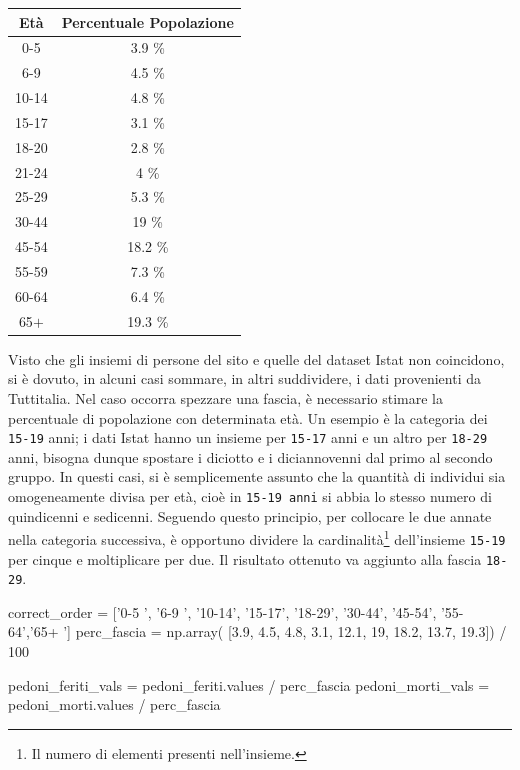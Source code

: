 \documentclass[a4paper,12pt]{report}
\newcommand{\columnstyle}[1]{\texttt{#1}}
\begin{document}
\begin{center}
    \def\arraystretch{1.5}%
    \begin{tabular}{ |c|c| } 
    \hline
    Età & Percentuale Popolazione \\ 
    \hline
    \rowcolor{TableGray}
    0-5     & 3.9 \% \\ 
    6-9     & 4.5 \% \\
    \rowcolor{TableGray}
    10-14   & 4.8 \% \\
    15-17   & 3.1 \% \\
    \rowcolor{TableGray}
    18-20   & 2.8 \% \\ 
    21-24   & 4   \% \\
    \rowcolor{TableGray}
    25-29   & 5.3 \% \\
    30-44   & 19  \% \\
    \rowcolor{TableGray}
    45-54   & 18.2 \% \\ 
    55-59   & 7.3 \% \\
    \rowcolor{TableGray}
    60-64   & 6.4 \% \\
    65$+$   & 19.3 \% \\
    \hline
    \end{tabular}
\end{center}

Visto che gli insiemi di persone del sito e quelle del dataset Istat non coincidono, 
si è dovuto, in alcuni casi sommare, in altri suddividere, 
i dati provenienti da Tuttitalia. 
Nel caso occorra spezzare una fascia, è necessario stimare la percentuale 
di popolazione con determinata età. 
Un esempio è la categoria dei \columnstyle{15-19} anni; 
i dati Istat hanno un insieme per \columnstyle{15-17} anni e un altro per 
\columnstyle{18-29} anni, 
bisogna dunque spostare i diciotto e i diciannovenni dal primo al 
secondo gruppo. 
In questi casi, si è semplicemente assunto che la quantità di individui sia omogeneamente 
divisa per età, cioè in \columnstyle{15-19 anni} si abbia lo stesso numero di 
quindicenni e sedicenni. 
Seguendo questo principio, per collocare le due annate nella categoria successiva, 
è opportuno dividere la cardinalità\footnote{Il numero di elementi presenti nell'insieme.} 
dell'insieme \columnstyle{15-19} per cinque e moltiplicare per due. 
Il risultato ottenuto va aggiunto alla fascia \columnstyle{18-29}. 

\begin{code}
correct_order =         ['0-5  ', '6-9  ', '10-14', '15-17', '18-29', '30-44', '45-54', '55-64','65+  ']
perc_fascia = np.array( [3.9, 4.5, 4.8, 3.1, 12.1, 19, 18.2, 13.7, 19.3]) / 100

pedoni_feriti_vals = pedoni_feriti.values / perc_fascia
pedoni_morti_vals = pedoni_morti.values / perc_fascia
\end{code}
\end{document}
